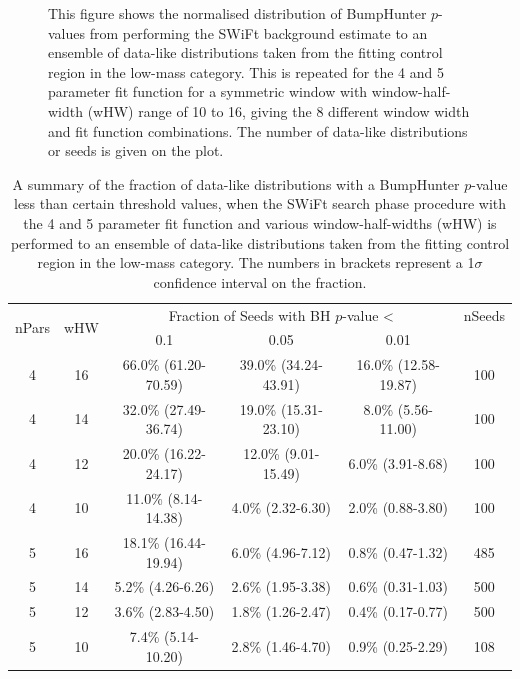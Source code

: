 \begin{figure}[!htb]
{}
\vspace{10pt}
\caption{\label{fig:bumpH_spuriousSignal}
  This figure shows the normalised distribution of {\sc BumpHunter} $p$-values from performing the SWiFt background estimate to an ensemble of
  data-like distributions taken from the fitting control region in the low-mass category.
  This is repeated for the 4 and 5 parameter fit function for a symmetric window with window-half-width (wHW) range of 10 to 16,
  giving the 8 different window width and fit function combinations.
  The number of data-like distributions or seeds is given on the plot.
}
\end{figure}



\begin{table}[!ht]
\centering
\begin{tabular}{|c|c||c|c|c|c|}
  \hline
\multirow{2}{*}{nPars} & \multirow{2}{*}{wHW} &\multicolumn{3}{c|}{Fraction of Seeds with BH $p$-value \textless} & nSeeds \\ \cline{3-5} 
                       &                      &    0.1                  & 0.05                & 0.01            &        \\ 
  \hline
  4 &   16& 66.0\% (61.20-70.59) & 39.0\% (34.24-43.91) & 16.0\% (12.58-19.87) &  100  \\
  4 &   14& 32.0\% (27.49-36.74) & 19.0\% (15.31-23.10) &  8.0\% (5.56-11.00) &  100  \\
  4 &   12& 20.0\% (16.22-24.17) & 12.0\% (9.01-15.49) &  6.0\% (3.91-8.68) &  100  \\
  4 &   10& 11.0\% (8.14-14.38) &  4.0\% (2.32-6.30) &  2.0\% (0.88-3.80) &  100  \\
  \hline
  5 &   16& 18.1\% (16.44-19.94) &  6.0\% (4.96-7.12) &  0.8\% (0.47-1.32) &  485  \\
  5 &   14&  5.2\% (4.26-6.26)   &  2.6\% (1.95-3.38) &  0.6\% (0.31-1.03) &  500  \\
  5 &   12&  3.6\% (2.83-4.50)   &  1.8\% (1.26-2.47) &  0.4\% (0.17-0.77) &  500  \\
  5 &   10&  7.4\% (5.14-10.20)  &  2.8\% (1.46-4.70) &  0.9\% (0.25-2.29) &  108  \\
  \hline
\end{tabular}
\vspace{10pt}
\caption{\label{tab:bumpH_lm_spuriousSignal}
  A summary of the fraction of data-like distributions 
  with a {\sc BumpHunter} $p$-value less than certain threshold values,
  when the SWiFt search phase procedure with the 4 and 5 parameter fit function
  and various window-half-widths (wHW) is performed to an ensemble of data-like distributions
  taken from the fitting control region in the low-mass category.
  The numbers in brackets represent a 1$\sigma$ confidence interval on the fraction.}
\end{table}


